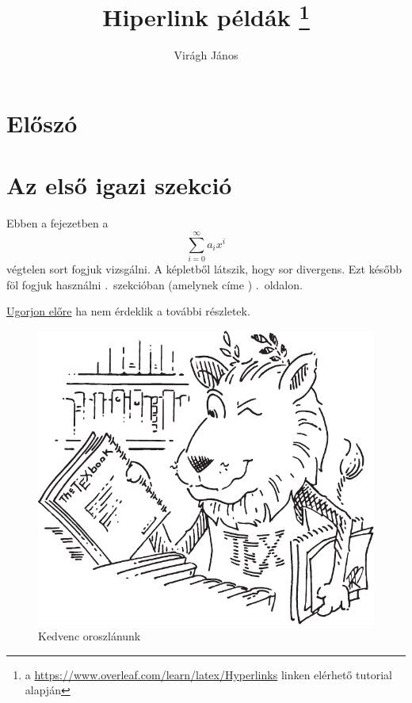 \documentclass{article}
\title{Hiperlink példák%
\footnote{a \url{https://www.overleaf.com/learn/latex/Hyperlinks} linken elérhető tutorial alapján}}
\author{Virágh János}
\begin{document}
\maketitle

\tableofcontents

{
\hypersetup{
	linkcolor=red         %
}
\listoffigures
}

\clearpage

\section*{Előszó}
\hulipsum[1]
\clearpage

\section{Az első igazi szekció}\label{sec:igazi}
Ebben a fejezetben  a
\label{p:kezdet}
\begin{equation}
\label{eq:1}
\sum_{i=0}^{\infty} a_i x^i
\end{equation}
végtelen sort fogjuk vizsgálni.
A képletből látszik, hogy \az{\eqref{eq:1}} sor divergens.
Ezt később föl fogjuk használni .~szekcióban (amelynek címe ) .~oldalon.

\label{p:eleje}
\hyperlink{lb:nemunalmas}{Ugorjon előre} ha nem érdeklik a további részletek.
\begin{figure}[ht]
\centering
\includegraphics[scale=0.75]{Lion.pdf}
\caption{Kedvenc oroszlánunk}
\label{fig:our-lion}
\end{figure}
\end{document}

